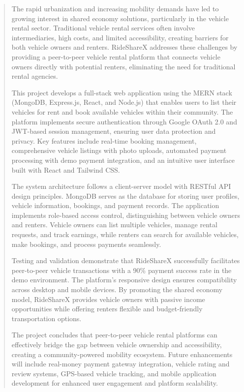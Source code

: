 \documentclass[12pt,a4paper]{report}
\begin{document}
	
	\begin{abstract}
		The rapid urbanization and increasing mobility demands have led to growing interest in shared economy solutions, particularly in the vehicle rental sector. Traditional vehicle rental services often involve intermediaries, high costs, and limited accessibility, creating barriers for both vehicle owners and renters. RideShareX addresses these challenges by providing a peer-to-peer vehicle rental platform that connects vehicle owners directly with potential renters, eliminating the need for traditional rental agencies.
		
		This project develops a full-stack web application using the MERN stack (MongoDB, Express.js, React, and Node.js) that enables users to list their vehicles for rent and book available vehicles within their community. The platform implements secure authentication through Google OAuth 2.0 and JWT-based session management, ensuring user data protection and privacy. Key features include real-time booking management, comprehensive vehicle listings with photo uploads, automated payment processing with demo payment integration, and an intuitive user interface built with React and Tailwind CSS.
		
		The system architecture follows a client-server model with RESTful API design principles. MongoDB serves as the database for storing user profiles, vehicle information, bookings, and payment records. The application implements role-based access control, distinguishing between vehicle owners and renters. Vehicle owners can list multiple vehicles, manage rental requests, and track earnings, while renters can search for available vehicles, make bookings, and process payments seamlessly.
		
		Testing and validation demonstrate that RideShareX successfully facilitates peer-to-peer vehicle transactions with a 90\% payment success rate in the demo environment. The platform's responsive design ensures compatibility across desktop and mobile devices. By promoting the shared economy model, RideShareX provides vehicle owners with passive income opportunities while offering renters flexible and budget-friendly transportation options.
		
		The project concludes that peer-to-peer vehicle rental platforms can effectively bridge the gap between vehicle ownership and accessibility, creating a community-powered mobility ecosystem. Future enhancements will include real-money payment gateway integration, vehicle rating and review systems, GPS-based vehicle tracking, and mobile application development for enhanced user engagement and platform scalability.
	\end{abstract}
\end{document}
